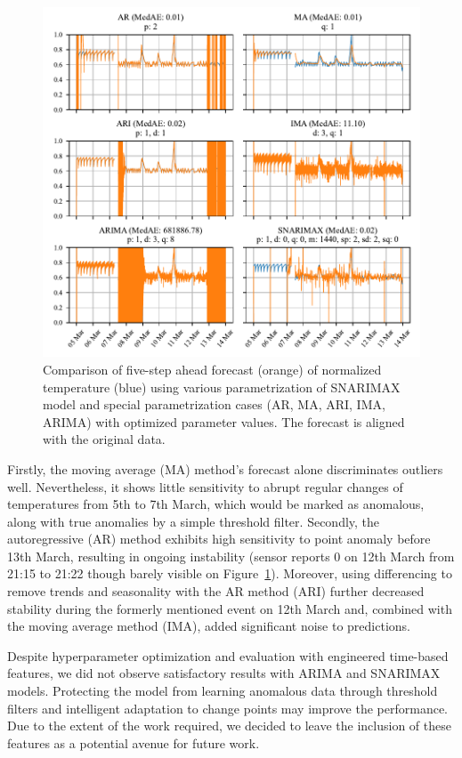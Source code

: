\documentclass{article}
\begin{document}
\begin{enumerate}
        \begin{figure}[htbp]
            \centerline{\includegraphics[width=\textwidth]{ARIMA_opt_results.pdf}}
            \caption{Comparison of five-step ahead forecast (orange) of normalized temperature (blue) using various parametrization of SNARIMAX model and special parametrization cases (AR, MA, ARI, IMA, ARIMA) with optimized parameter values. The forecast is aligned with the original data.}
            \label{fig:snarimax}
      \end{figure}

       Firstly, the moving average (MA) method's forecast alone discriminates outliers well. Nevertheless, it shows little sensitivity to abrupt regular changes of temperatures from 5th to 7th March, which would be marked as anomalous, along with true anomalies by a simple threshold filter. Secondly, the autoregressive (AR) method exhibits high sensitivity to point anomaly before 13th March, resulting in ongoing instability (sensor reports 0 on 12th March from 21:15 to 21:22 though barely visible on Figure~\ref{fig:snarimax}). Moreover, using differencing to remove trends and seasonality with the AR method (ARI) further decreased stability during the formerly mentioned event on 12th March and, combined with the moving average method (IMA), added significant noise to predictions.

        Despite hyperparameter optimization and evaluation with engineered time-based features, we did not observe satisfactory results with ARIMA and SNARIMAX models. Protecting the model from learning anomalous data through threshold filters and intelligent adaptation to change points may improve the performance. Due to the extent of the work required, we decided to leave the inclusion of these features as a potential avenue for future work.


\end{enumerate}
\end{document}
